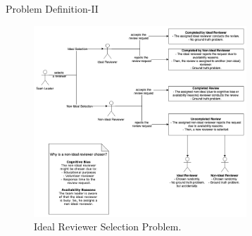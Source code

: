 \documentclass{beamer}
\begin{document}
\begin{frame}{Problem Definition-II}
    \begin{figure}
    \includegraphics[width=8cm]{new-figure.png}
    \caption{\label{fig:your-figure}Ideal Reviewer Selection Problem.}
    \end{figure}
\end{frame}
%
\end{document}
